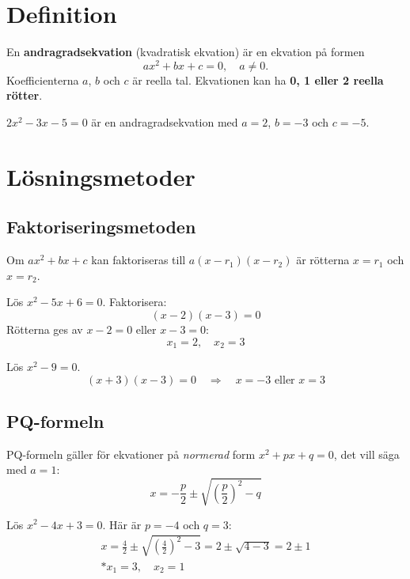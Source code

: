 
\section{Definition}
\label{c6:sec:definition}
En \textbf{andragradsekvation} (kvadratisk ekvation) är en ekvation på formen
\[
  ax^2 + bx + c = 0, \quad a \neq 0.
\]
Koefficienterna $a$, $b$ och $c$ är reella tal. Ekvationen kan ha \textbf{0, 1 eller 2 reella
rötter}.

\begin{exempel}
$2x^2 - 3x - 5 = 0$ är en andragradsekvation med $a = 2$, $b = -3$ och $c = -5$.
\end{exempel}

\section{Lösningsmetoder}
\label{c6:sec:losningsmetoder}

\subsection{Faktoriseringsmetoden}
\label{c6:sec:faktorisering}
Om $ax^2 + bx + c$ kan faktoriseras till $a(x - r_1)(x - r_2)$ är rötterna $x = r_1$ och
$x = r_2$.

\begin{exempel}
Lös $x^2 - 5x + 6 = 0$. Faktorisera:
\[
  (x - 2)(x - 3) = 0
\]
Rötterna ges av $x - 2 = 0$ eller $x - 3 = 0$:
\[
  x_1 = 2, \quad x_2 = 3
\]
\end{exempel}

\begin{exempel}[Konjugatregeln]
Lös $x^2 - 9 = 0$.
\[
  (x + 3)(x - 3) = 0 \quad \Rightarrow \quad x = -3 \text{ eller } x = 3
\]
\end{exempel}

\subsection{PQ-formeln}
\label{c6:sec:pq}
PQ-formeln gäller för ekvationer på \emph{normerad} form $x^2 + px + q = 0$, det vill säga med
$a = 1$:
\[
  x = -\frac{p}{2} \pm \sqrt{\left(\frac{p}{2}\right)^2 - q}
\]

\begin{exempel}
Lös $x^2 - 4x + 3 = 0$. Här är $p = -4$ och $q = 3$:
\begin{gather*}
  x = \frac{4}{2} \pm \sqrt{\left(\frac{4}{2}\right)^2 - 3} = 2 \pm \sqrt{4 - 3} = 2 \pm 1 \\*
  x_1 = 3, \quad x_2 = 1
\end{gather*}
\end{exempel}


